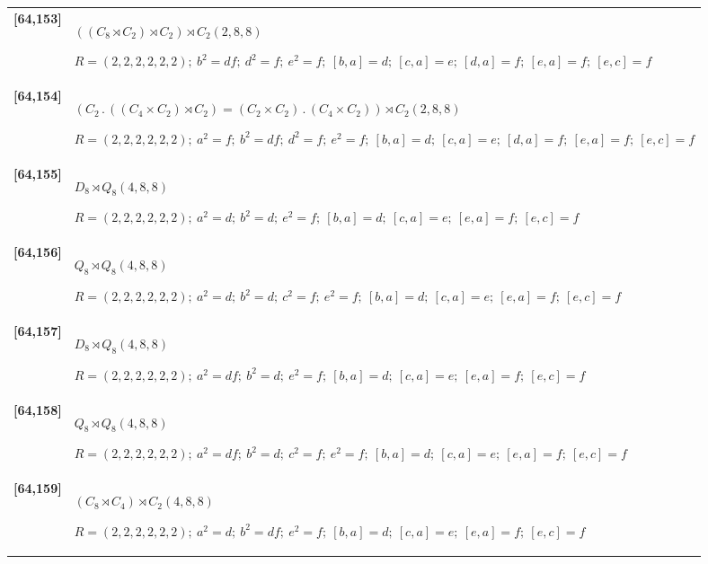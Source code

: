 \documentclass[UTF8,fontset=fandol,11pt,a4paper]{ctexart}
\begin{document}
\begin{longtable}{@{}p{17mm}>{\raggedright\arraybackslash}p{141mm}@{}}
\textbf{[64,153]} & $((C_{8}\rtimes C_{2})\rtimes C_{2})\rtimes C_{2}$\quad $(2,8,8)$\par\(R=(2,2,2,2,2,2);\allowbreak\ b^{2}=df;\allowbreak\ d^{2}=f;\allowbreak\ e^{2}=f;\allowbreak\ [b,a]=d;\allowbreak\ [c,a]=e;\allowbreak\ [d,a]=f;\allowbreak\ [e,a]=f;\allowbreak\ [e,c]=f\)\\[3pt]

\textbf{[64,154]} & $(C_{2}\mathbin{.} ((C_{4}\times C_{2})\rtimes C_{2}) = (C_{2}\times C_{2})\mathbin{.} (C_{4}\times C_{2}))\rtimes C_{2}$\quad $(2,8,8)$\par\(R=(2,2,2,2,2,2);\allowbreak\ a^{2}=f;\allowbreak\ b^{2}=df;\allowbreak\ d^{2}=f;\allowbreak\ e^{2}=f;\allowbreak\ [b,a]=d;\allowbreak\ [c,a]=e;\allowbreak\ [d,a]=f;\allowbreak\ [e,a]=f;\allowbreak\ [e,c]=f\)\\[3pt]

\textbf{[64,155]} & $D_{8}\rtimes Q_{8}$\quad $(4,8,8)$\par\(R=(2,2,2,2,2,2);\allowbreak\ a^{2}=d;\allowbreak\ b^{2}=d;\allowbreak\ e^{2}=f;\allowbreak\ [b,a]=d;\allowbreak\ [c,a]=e;\allowbreak\ [e,a]=f;\allowbreak\ [e,c]=f\)\\[3pt]

\textbf{[64,156]} & $Q_{8}\rtimes Q_{8}$\quad $(4,8,8)$\par\(R=(2,2,2,2,2,2);\allowbreak\ a^{2}=d;\allowbreak\ b^{2}=d;\allowbreak\ c^{2}=f;\allowbreak\ e^{2}=f;\allowbreak\ [b,a]=d;\allowbreak\ [c,a]=e;\allowbreak\ [e,a]=f;\allowbreak\ [e,c]=f\)\\[3pt]

\textbf{[64,157]} & $D_{8}\rtimes Q_{8}$\quad $(4,8,8)$\par\(R=(2,2,2,2,2,2);\allowbreak\ a^{2}=df;\allowbreak\ b^{2}=d;\allowbreak\ e^{2}=f;\allowbreak\ [b,a]=d;\allowbreak\ [c,a]=e;\allowbreak\ [e,a]=f;\allowbreak\ [e,c]=f\)\\[3pt]

\textbf{[64,158]} & $Q_{8}\rtimes Q_{8}$\quad $(4,8,8)$\par\(R=(2,2,2,2,2,2);\allowbreak\ a^{2}=df;\allowbreak\ b^{2}=d;\allowbreak\ c^{2}=f;\allowbreak\ e^{2}=f;\allowbreak\ [b,a]=d;\allowbreak\ [c,a]=e;\allowbreak\ [e,a]=f;\allowbreak\ [e,c]=f\)\\[3pt]

\textbf{[64,159]} & $(C_{8}\rtimes C_{4})\rtimes C_{2}$\quad $(4,8,8)$\par\(R=(2,2,2,2,2,2);\allowbreak\ a^{2}=d;\allowbreak\ b^{2}=df;\allowbreak\ e^{2}=f;\allowbreak\ [b,a]=d;\allowbreak\ [c,a]=e;\allowbreak\ [e,a]=f;\allowbreak\ [e,c]=f\)\\[3pt]


\end{longtable}
\end{document}
